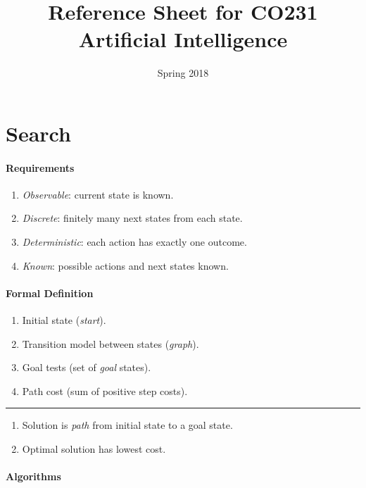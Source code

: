 \documentclass[twocolumn,english]{article}
\begin{document}
\title{Reference Sheet for CO231 Artificial Intelligence}

\date{Spring 2018}
\maketitle

\section{Search}

\paragraph{Requirements}
\begin{enumerate}
\item \emph{Observable}: current state is known.
\item \emph{Discrete}: finitely many next states from each state.
\item \emph{Deterministic}: each action has exactly one outcome.
\item \emph{Known}: possible actions and next states known.
\end{enumerate}

\paragraph{Formal Definition}
\begin{enumerate}
\item Initial state (\emph{start}).
\item Transition model between states (\emph{graph}).
\item Goal tests (set of \emph{goal} states).
\item Path cost (sum of positive step costs).
\end{enumerate}
\rule[0.5ex]{0.25\columnwidth}{0.5pt}
\begin{enumerate}
\item Solution is \emph{path} from initial state to a goal state.
\item Optimal solution has lowest cost.
\end{enumerate}

\paragraph{Algorithms}
\end{document}
